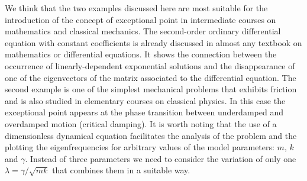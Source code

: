 \documentclass{article}
\begin{document}
We think that the two examples discussed here are most suitable for the
introduction of the concept of exceptional point in intermediate courses on
mathematics and classical mechanics. The second-order ordinary differential
equation with constant coefficients is already discussed in almost any
textbook on mathematics or differential equations\cite{A67}. It shows the
connection between the occurrence of linearly-dependent exponential
solutions and the disappearance of one of the eigenvectors of the matrix
associated to the differential equation. The second example is one of the
simplest mechanical problems that exhibits friction and is also studied in
elementary courses on classical physics\cite{S67}. In this case the
exceptional point appears at the phase transition between underdamped and
overdamped motion (critical damping). It is worth noting that the use of a
dimensionless dynamical equation facilitates the analysis of the problem and
the plotting the eigenfrequencies for arbitrary values of the model
parameters: $m$, $k$ and $\gamma $. Instead of three parameters we need to
consider the variation of only one $\lambda =\gamma /\sqrt{mk}$ that
combines them in a suitable way.
\end{document}
